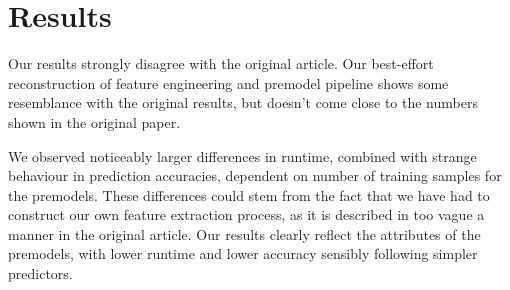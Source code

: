 %
%    



\section{Results}
Our results strongly disagree with the original article. Our best-effort reconstruction of feature engineering and premodel pipeline shows some resemblance with the original results, but doesn't come close to the numbers shown in the original paper.

We observed noticeably larger differences in runtime, combined with strange behaviour in prediction accuracies, dependent on number of training samples for the premodels. These differences could stem from the fact that we have had to construct our own feature extraction process, as it is described in too vague a manner in the original article. Our results clearly reflect the attributes of the premodels, with lower runtime and lower accuracy sensibly following simpler predictors.

